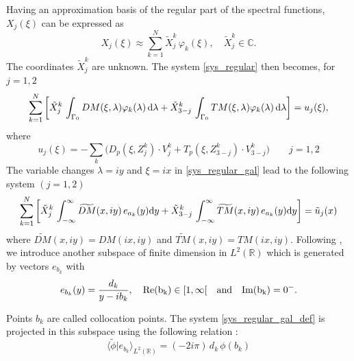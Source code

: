 Having an approximation basis of the regular part of the spectral functions, $X_j(\xi)$ can be expressed as
\begin{equation}
\label{regular_part_decomp}
X_j(\xi) \approx \sum_{k=1}^N \tilde{X}_j^k \, \varphi_k(\xi), \quad \tilde{X}_j^k \in \mathbb{C}.
\end{equation}
The coordinates $\tilde{X}_j^k$ are unknown. The system \eqref{sys_regular} then becomes, for $j=1,2$
\begin{equation}
\label{sys_regular_gal}
\sum_{k=1}^N \left[ \tilde{X}_j^k \, \int_{\Gamma_0} DM(\xi,\lambda) \varphi_k(\lambda) \, {\rm d} \lambda + \tilde{X}_{3-j}^k \, \int_{\Gamma_0} TM(\xi,\lambda) \varphi_k(\lambda) \, {\rm d} \lambda \right] = u_j(\xi), 
\end{equation}
where
\begin{equation}
\label{second_member}
u_j(\xi) = -\sum_k \Big( D_p(\xi,Z_j^k)\cdot V_j^k+ T_p(\xi,Z_{3-j}^k)\cdot V_{3-j}^k\Big) \qquad j=1,2
\end{equation}
The variable changes $\lambda = iy$ and $\xi = ix$ in \eqref{sys_regular_gal} lead to the following system $(j=1,2)$
\begin{equation}
\label{sys_regular_gal_def}
\sum_{k=1}^N \left[ \tilde{X}_j^k \, \int_{-\infty}^\infty  \widetilde{DM}(x,iy) \, e_{a_k}(y) {\rm d} y + \tilde{X}_{3-j}^k \, \int_{-\infty}^\infty  \widetilde{TM}(x,iy) \, e_{a_k}(y) {\rm d} y \right] = \tilde u_j(x) \\
\end{equation}
where $\widetilde{DM}(x,iy) = DM(ix,iy)$ and $\widetilde{TM}(x,iy) = TM(ix,iy)$. Following \cite{CroisilleLebeau}, we introduce another subspace of finite dimension in $L^2(\mathbb{R})$ which is generated by vectors $e_{b_k}$ with
\begin{equation}
\label{points_collocation}
e_{b_k}(y)=\frac{d_k}{y-ib_k}, \quad  \rm Re (b_k) \in [1,\infty[  \quad \text{and}  \quad {\rm Im} (b_k) = 0^-.
\end{equation}

Points $b_k$ are called collocation points.  The system \eqref{sys_regular_gal_def} is projected in this subspace using the following relation :
\begin{equation}
\label{dot_product}
\langle \tilde \phi\vert e_{b_k}\rangle_{L^2(\mathbb R)}= (-2i\pi) \, d_k \,  \phi (b_k)
\end{equation}


